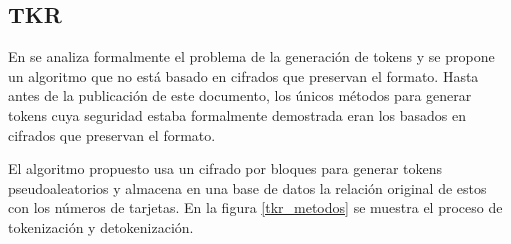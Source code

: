 %
%

\subsection{TKR}

En \cite{doc_sandra} se analiza formalmente el problema de la generación de
tokens y se propone un algoritmo que no está basado en cifrados que preservan el
formato. Hasta antes de la publicación de este documento, los únicos métodos
para generar tokens cuya seguridad estaba formalmente demostrada eran los
basados en cifrados que preservan el formato.

El algoritmo propuesto usa un cifrado por bloques para generar tokens
pseudoaleatorios y almacena en una base de datos la relación original de estos
con los números de tarjetas. En la figura \ref{tkr_metodos} se muestra el
proceso de tokenización y detokenización.

